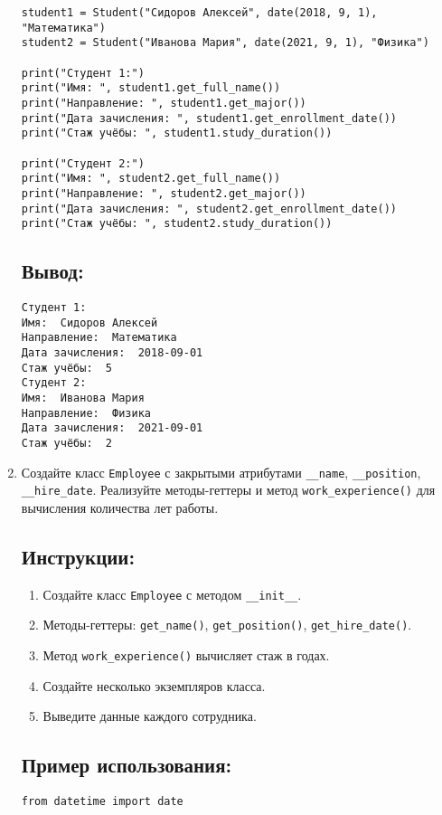 \begin{enumerate}
\begin{lstlisting}[caption=Пример кода]
student1 = Student("Сидоров Алексей", date(2018, 9, 1), "Математика")
student2 = Student("Иванова Мария", date(2021, 9, 1), "Физика")

print("Студент 1:")
print("Имя: ", student1.get_full_name())
print("Направление: ", student1.get_major())
print("Дата зачисления: ", student1.get_enrollment_date())
print("Стаж учёбы: ", student1.study_duration())

print("Студент 2:")
print("Имя: ", student2.get_full_name())
print("Направление: ", student2.get_major())
print("Дата зачисления: ", student2.get_enrollment_date())
print("Стаж учёбы: ", student2.study_duration())
\end{lstlisting}

\subsection*{Вывод:}
\begin{lstlisting}[caption=Ожидаемый вывод]
Студент 1:
Имя:  Сидоров Алексей
Направление:  Математика
Дата зачисления:  2018-09-01
Стаж учёбы:  5
Студент 2:
Имя:  Иванова Мария
Направление:  Физика
Дата зачисления:  2021-09-01
Стаж учёбы:  2
\end{lstlisting}

\item
Создайте класс \texttt{Employee} с закрытыми атрибутами \texttt{\_\_name}, \texttt{\_\_position}, \texttt{\_\_hire\_date}. Реализуйте методы-геттеры и метод \texttt{work\_experience()} для вычисления количества лет работы.

\subsection*{Инструкции:}
\begin{enumerate}
    \item Создайте класс \texttt{Employee} с методом \texttt{\_\_init\_\_}.
    \item Методы-геттеры: \texttt{get\_name()}, \texttt{get\_position()}, \texttt{get\_hire\_date()}.
    \item Метод \texttt{work\_experience()} вычисляет стаж в годах.
    \item Создайте несколько экземпляров класса.
    \item Выведите данные каждого сотрудника.
\end{enumerate}

\subsection*{Пример использования:}
\begin{lstlisting}[caption=Пример кода]
from datetime import date


\end{lstlisting}
\end{enumerate}
